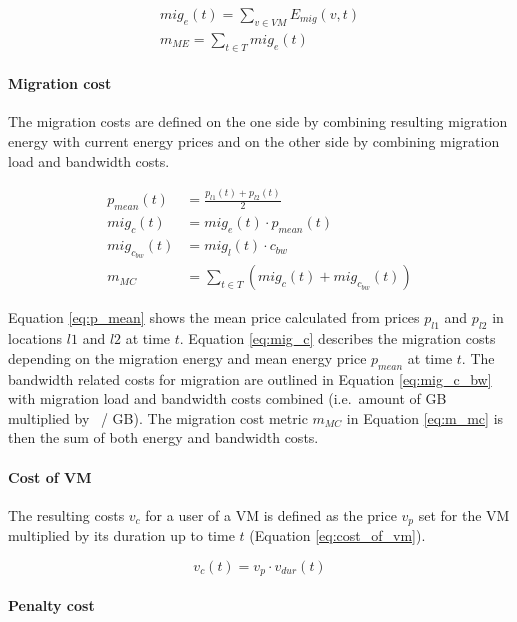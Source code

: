\begin{align}
	mig_e(t) = \sum_{v \in VM} E_{mig}(v,t) \label{eq:migration_energy_by_time}\\
	m_{ME} = \sum_{t \in T} mig_e(t) \label{eq:migration_energy_total}
\end{align}

\paragraph{Migration cost}
The migration costs are defined on the one side by combining resulting migration energy with current energy prices and on the other side by combining migration load and bandwidth costs. 

\begin{align}
	p_{mean}(t) &= \frac{p_{l1}(t) + p_{l2}(t)}{2} \label{eq:p_mean} \\
	mig_c(t) &= mig_e(t) \cdot p_{mean}(t) \label{eq:mig_c} \\
	mig_{c_{bw}}(t) &= mig_l(t) \cdot c_{bw} \label{eq:mig_c_bw} \\
	m_{MC} &= \sum_{t \in T} \left( mig_c(t) + mig_{c_{bw}}(t) \right) \label{eq:m_mc} 
\end{align}

Equation \ref{eq:p_mean} shows the mean price calculated from prices $p_{l1}$ and $p_{l2}$ in locations $l1$ and $l2$ at time $t$. 
Equation \ref{eq:mig_c} describes the migration costs depending on the migration energy and mean energy price $p_{mean}$ at time $t$. 
The bandwidth related costs for migration are outlined in Equation \ref{eq:mig_c_bw} with migration load and bandwidth costs combined (i.e.~amount of GB multiplied by \cent \ / GB). The migration cost metric $m_{MC}$ in Equation \ref{eq:m_mc} is then the sum of both energy and bandwidth costs. 

\paragraph{Cost of VM}
The resulting costs $v_c$ for a user of a VM is defined as the price $v_p$ set for the VM multiplied by its duration up to time $t$ (Equation \ref{eq:cost_of_vm}). 

\begin{equation}
	v_c(t) = v_p \cdot v_{dur}(t)
\label{eq:cost_of_vm}
\end{equation}

\paragraph{Penalty cost}

